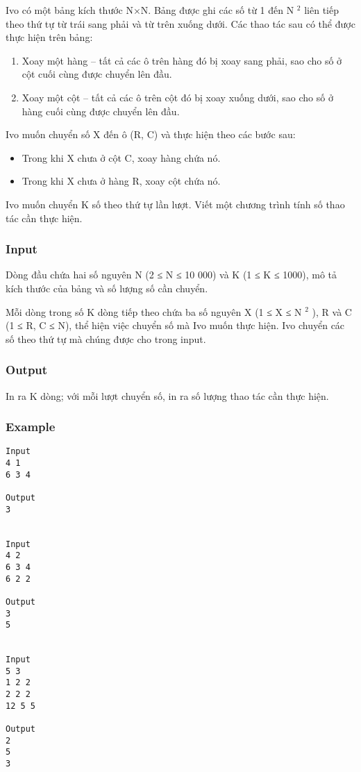 

Ivo có một bảng kích thước N×N. Bảng được ghi các số từ 1 đến N $^ 2 $ liên tiếp theo thứ tự từ trái sang phải và từ trên xuống dưới. Các thao tác sau có thể được thực hiện trên bảng:
\begin{enumerate}
	\item Xoay một hàng – tất cả các ô trên hàng đó bị xoay sang phải, sao cho số ở cột cuối cùng được chuyển lên đầu.
	\item Xoay một cột – tất cả các ô trên cột đó bị xoay xuống dưới, sao cho số ở hàng cuối cùng được chuyển lên đầu.
\end{enumerate}

Ivo muốn chuyển số X đến ô (R, C) và thực hiện theo các bước sau:
\begin{itemize}
	\item Trong khi X chưa ở cột C, xoay hàng chứa nó.
	\item Trong khi X chưa ở hàng R, xoay cột chứa nó.
\end{itemize}

Ivo muốn chuyển K số theo thứ tự lần lượt. Viết một chương trình tính số thao tác cần thực hiện.

\subsubsection{Input}

Dòng đầu chứa hai số nguyên N (2 ≤ N ≤ 10 000) và K (1 ≤ K ≤ 1000), mô tả kích thước của bảng và số lượng số cần chuyển.

Mỗi dòng trong số K dòng tiếp theo chứa ba số nguyên X (1 ≤ X ≤ N $^ 2 $ ), R và C (1 ≤ R, C ≤ N), thể hiện việc chuyển số mà Ivo muốn thực hiện. Ivo chuyển các số theo thứ tự mà chúng được cho trong input.

\subsubsection{Output}

In ra K dòng; với mỗi lượt chuyển số, in ra số lượng thao tác cần thực hiện.

\subsubsection{Example}
\begin{verbatim}
Input
4 1
6 3 4

Output
3


Input
4 2
6 3 4
6 2 2

Output
3
5


Input
5 3
1 2 2
2 2 2
12 5 5

Output
2
5
3
\end{verbatim}